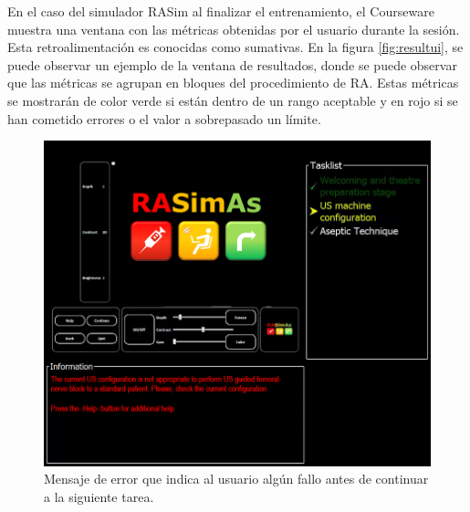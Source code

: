 En el caso del simulador \ac{RASim} al finalizar el entrenamiento, el \ac{Courseware} muestra una ventana con las métricas obtenidas por el usuario durante la sesión. Esta retroalimentación es conocidas como sumativas. En la figura \ref{fig:resultui}, se puede observar un ejemplo de la ventana de resultados, donde se puede observar que las métricas se agrupan en bloques del procedimiento de \ac{RA}. Estas métricas se mostrarán de color verde si están dentro de un rango aceptable y en rojo si se han cometido errores o el valor a sobrepasado un límite.

\begin{figure}[h]
    \centering
    \includegraphics[width=\textwidth]{IMG/errorruntime.png}
    \caption{Mensaje de error que indica al usuario algún fallo antes de continuar a la siguiente tarea.}
    \label{fig:errorrun}
\end{figure}
